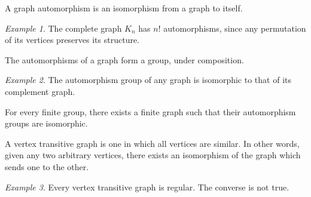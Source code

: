 \documentclass[11pt]{article}
\theoremstyle{definition}
\theoremstyle{remark}
\newtheorem*{example}{Example}
\numberwithin{equation}{section}
\begin{document}
    \begin{definition}
        A graph automorphism is an isomorphism from a graph to itself.
    \end{definition}
    \begin{example}
        The complete graph $K_n$ has $n!$ automorphisms, since any permutation of its
        vertices preserves its structure.
    \end{example}

    \begin{lemma}
        The automorphisms of a graph form a group, under composition.
    \end{lemma}
    \begin{example}
        The automorphism group of any graph is isomorphic to that of its complement
        graph.
    \end{example}

    \begin{theorem}[Frucht]
        For every finite group, there exists a finite graph such that their
        automorphism groups are isomorphic.
    \end{theorem}

    \begin{definition}
        A vertex transitive graph is one in which all vertices are similar. In other
        words, given any two arbitrary vertices, there exists an isomorphism of the
        graph which sends one to the other.
    \end{definition}
    \begin{example}
        Every vertex transitive graph is regular. The converse is not true.
    \end{example}
    
\end{document}
